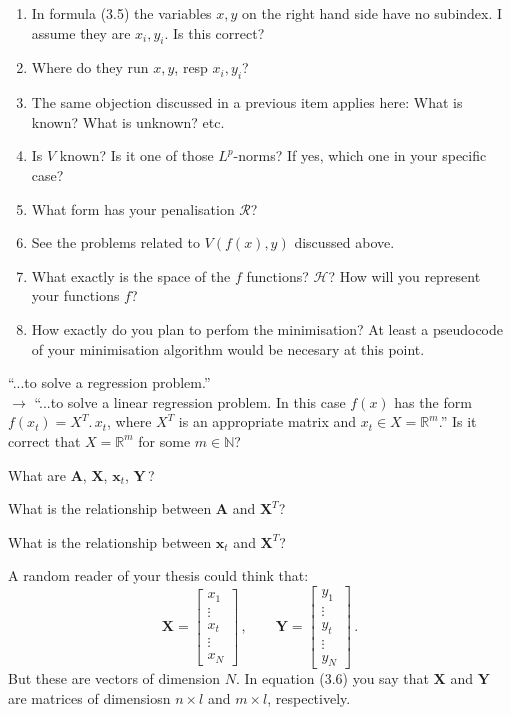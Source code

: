 \documentclass[12pt,reqno]{amsart}
\def\N{{\mathbb N }}
\def\R{{\mathbb R }}
\def\red#1{{\color{red} #1}}
\begin{document}
\begin{description}[style=unboxed,leftmargin=0cm,itemsep=3ex]
\begin{enumerate}
\item
In formula (3.5) the variables $x,y$ on the right hand side have no
subindex. I assume they are $x_i,y_i$. Is this correct?
\item
Where do they run $x,y$, resp $x_i,y_i$?
\item
The same objection discussed in a previous item applies here:
What is known? What is unknown? etc.
\item
Is $V$ known? Is it one of those $L^p$-norms? If yes, which one in
your specific case?
\item
What form has your penalisation $\mathcal{R}$?
\item
See the problems related to $V(f(x),y)$ discussed above.
\item
What exactly is the space of the $f$ functions?
$\mathcal{H}$?
How will you represent your functions $f$?
\item
How exactly do you plan to perfom the minimisation?
At least a pseudocode of your minimisation algorithm would be necesary
at this point.
\end{enumerate}

``...to solve a regression problem.'' \\
\quad$\rightarrow$\quad
``...to solve a \red{linear} regression problem. 
In this case $f(x)$ has the form $f(x_t)=X^T.\,x_t$, where $X^T$ is an
appropriate matrix and $x_t\in X=\R^m$.''
Is it correct that $X=\R^m$ for some $m\in\N$?

What are $\mathbf{A}$, $\mathbf{X}$, $\mathbf{x}_t$, $\mathbf{Y}$\,?

What is the relationship between $\mathbf{A}$ and $\mathbf{X}^T$?

What is the relationship between $\mathbf{x}_t$ and $\mathbf{X}^T$?

A random reader of your thesis could think that:
$$
\mathbf{X} 
= \begin{bmatrix} x_1 \\ \vdots \\ x_t \\ \vdots \\ x_N \end{bmatrix}\,,
\qquad
\mathbf{Y} 
= \begin{bmatrix} y_1 \\ \vdots \\ y_t \\ \vdots \\ y_N \end{bmatrix}\,.
$$
But these are vectors of dimension $N$.
In equation (3.6) you say that $\mathbf{X}$ and $\mathbf{Y}$ are matrices
of dimensiosn $n\times l$ and $m\times l$, respectively.


\end{description}
\end{document}
